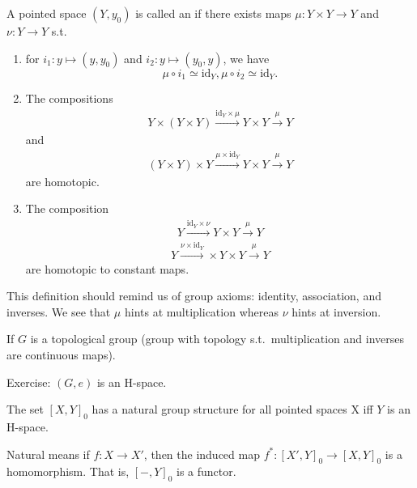 \documentclass[12pt,class=article,crop=false]{standalone}
\begin{document}
\begin{defn}
A pointed space $ (Y,y_0)$ is called an  if there exists maps $ \mu: Y \times Y \to Y$ and $ \nu: Y \to Y$ s.t.\ 
\begin{enumerate}[label=(\arabic*)]
	\item for $ i_1: y \mapsto (y,y_0)$ and $ i_2: y\mapsto (y_0,y)$, we have
		\[
\mu \circ i_1 \simeq  \text{id}_Y, \mu \circ i_2 \simeq  \text{id}_Y 
.\] 
\item The compositions
\begin{align*}
	Y \times (Y\times Y) \xrightarrow{ \text{id}_Y \times \mu } Y \times Y \xrightarrow{ \mu} Y  
\end{align*}
and
\begin{align*}
	(Y \times Y) \times Y \xrightarrow{ \mu \times \text{id}_Y } Y \times Y \xrightarrow{ \mu}  Y  
\end{align*}
are homotopic.
\item The composition
\begin{align*}
	Y \xrightarrow{ \text{id}_Y  \times \nu} Y \times Y \xrightarrow{ \mu} Y  
\end{align*}
\begin{align*}
	Y \xrightarrow{ \nu \times \text{id}_Y } \times Y \times Y \xrightarrow{ \mu}Y  
\end{align*}
are homotopic to constant maps.
\end{enumerate}
\end{defn}
\begin{remark}
This definition should remind us of group axioms: identity, association, and inverses. We see that $ \mu$ hints at multiplication whereas $ \nu$ hints at inversion.
\end{remark}
\begin{eg}
If $ G$ is a topological group (group with topology  s.t.\ multiplication and inverses are continuous maps).

Exercise: $ (G, e)$ is an H-space.
\end{eg}

\begin{thm}
	The set $ [X,Y]_0$ has a natural group structure for all pointed spaces X  iff $ Y$ is an H-space.
\end{thm}
Natural means if $ f: X \to X'$, then the induced map $ f^* : [X',Y]_0 \to [X,Y]_0$ is a homomorphism. That is, $ [-,Y]_0$ is a functor.
\end{document}
